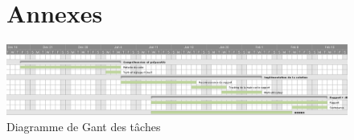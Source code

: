 \documentclass[a4paper,12pt]{report}
\author{Rémy François, Damien Druel, Erwan Douaille et Yoan Miranda}
\title{}
\begin{document}

\thispagestyle{empty}

\thispagestyle{empty}

\thispagestyle{empty}

\tableofcontents
\thispagestyle{empty}
\newpage
\setcounter{page}{1} 











\pagestyle{empty}
\begin{figure}[!ht]
\chapter{Annexes}
	\center	
	\includegraphics[scale=0.4,angle=90]{image/gantt.png}
	\caption{Diagramme de Gant des tâches}
\end{figure}

\newpage
%
\end{document}
